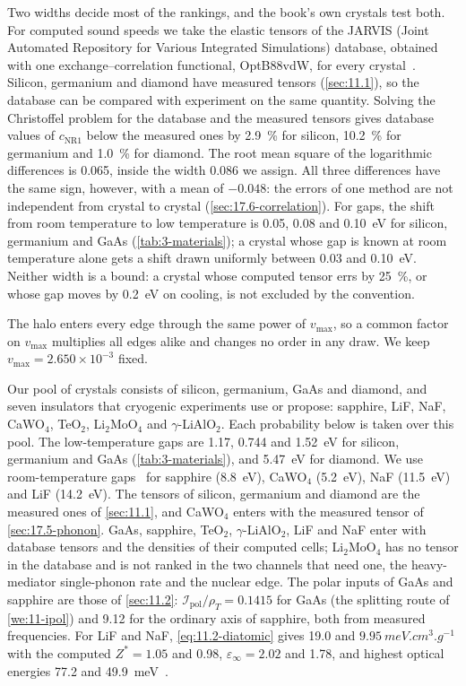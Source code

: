 Two widths decide most of the rankings, and the book's own crystals test both. For computed sound speeds we take the elastic tensors of the JARVIS (Joint Automated Repository for Various Integrated Simulations) database, obtained with one exchange--correlation functional, OptB88vdW, for every crystal~\cite{choudhary2018elastic}. Silicon, germanium and diamond have measured tensors (\cref{sec:11.1}), so the database can be compared with experiment on the same quantity. Solving the Christoffel problem for the database and the measured tensors gives database values of $c_{\mathrm{NR1}}$ below the measured ones by \SI{2.9}{\percent} for silicon, \SI{10.2}{\percent} for germanium and \SI{1.0}{\percent} for diamond. The root mean square of the logarithmic differences is 0.065, inside the width 0.086 we assign. All three differences have the same sign, however, with a mean of $-0.048$: the errors of one method are not independent from crystal to crystal (\cref{sec:17.6-correlation}). For gaps, the shift from room temperature to low temperature is 0.05, 0.08 and \SI{0.10}{eV} for silicon, germanium and GaAs (\cref{tab:3-materials}); a crystal whose gap is known at room temperature alone gets a shift drawn uniformly between 0.03 and \SI{0.10}{eV}. Neither width is a bound: a crystal whose computed tensor errs by \SI{25}{\percent}, or whose gap moves by \SI{0.2}{eV} on cooling, is not excluded by the convention.

The halo enters every edge through the same power of $v_{\mathrm{max}}$, so a common factor on $v_{\mathrm{max}}$ multiplies all edges alike and changes no order in any draw. We keep $v_{\mathrm{max}} = 2.650\times10^{-3}$ fixed.

Our pool of crystals consists of silicon, germanium, GaAs and diamond, and seven insulators that cryogenic experiments use or propose: sapphire, LiF, NaF, CaWO$_4$, TeO$_2$, Li$_2$MoO$_4$ and $\gamma$-LiAlO$_2$. Each probability below is taken over this pool. The low-temperature gaps are 1.17, 0.744 and \SI{1.52}{eV} for silicon, germanium and GaAs (\cref{tab:3-materials}), and 5.47~eV for diamond. We use room-temperature gaps~\cite[Table~I]{griffin2020multichannel} for sapphire (8.8~eV), CaWO$_4$ (5.2~eV), NaF (11.5~eV) and LiF (14.2~eV). The tensors of silicon, germanium and diamond are the measured ones of \cref{sec:11.1}, and CaWO$_4$ enters with the measured tensor of \cref{sec:17.5-phonon}. GaAs, sapphire, TeO$_2$, $\gamma$-LiAlO$_2$, LiF and NaF enter with database tensors and the densities of their computed cells; Li$_2$MoO$_4$ has no tensor in the database and is not ranked in the two channels that need one, the heavy-mediator single-phonon rate and the nuclear edge. The polar inputs of GaAs and sapphire are those of \cref{sec:11.2}: $\mathcal{I}_{\mathrm{pol}}/\rho_T = 0.1415$ for GaAs (the splitting route of \cref{we:11-ipol}) and 9.12 for the ordinary axis of sapphire, both from measured frequencies. For LiF and NaF, \cref{eq:11.2-diatomic} gives 19.0 and $\SI{9.95}{meV.cm^3.g^{-1}}$ with the computed $Z^* = 1.05$ and 0.98, $\varepsilon_\infty = 2.02$ and 1.78, and highest optical energies 77.2 and \SI{49.9}{meV}~\cite[Table~I]{griffin2020multichannel}.

